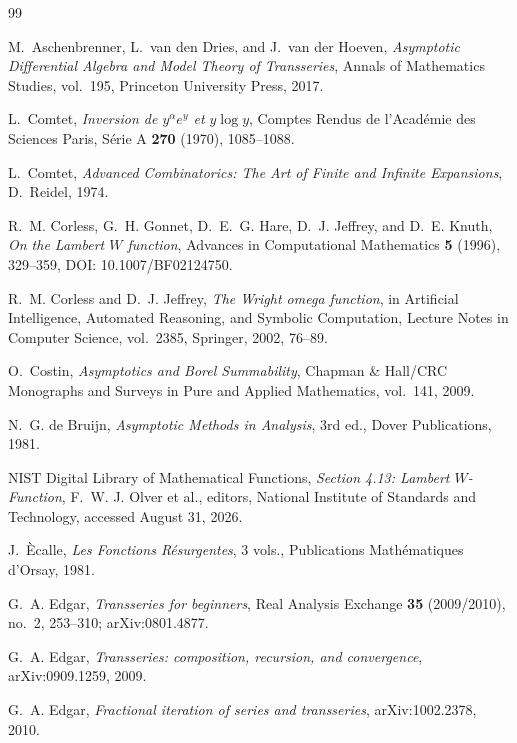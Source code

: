 \documentclass[11pt]{article}
\theoremstyle{pltheorem}
\begin{document}
\clearpage
\begin{thebibliography}{99}

M.~Aschenbrenner, L.~van den Dries, and J.~van der Hoeven,
\emph{Asymptotic Differential Algebra and Model Theory of Transseries},
Annals of Mathematics Studies, vol.~195, Princeton University Press, 2017.

L.~Comtet,
\emph{Inversion de \(y^\alpha e^y\) et \(y\log y\)},
Comptes Rendus de l'Acad\'emie des Sciences Paris, S\'erie A
\textbf{270} (1970), 1085--1088.

L.~Comtet,
\emph{Advanced Combinatorics: The Art of Finite and Infinite Expansions},
D.~Reidel, 1974.

R.~M. Corless, G.~H. Gonnet, D.~E.~G. Hare, D.~J. Jeffrey, and D.~E. Knuth,
\emph{On the Lambert \(W\) function},
Advances in Computational Mathematics \textbf{5} (1996), 329--359,
DOI: 10.1007/BF02124750.

R.~M. Corless and D.~J. Jeffrey,
\emph{The Wright omega function},
in Artificial Intelligence, Automated Reasoning, and Symbolic Computation,
Lecture Notes in Computer Science, vol.~2385, Springer, 2002, 76--89.

O.~Costin,
\emph{Asymptotics and Borel Summability},
Chapman \& Hall/CRC Monographs and Surveys in Pure and Applied Mathematics,
vol.~141, 2009.

N.~G. de Bruijn,
\emph{Asymptotic Methods in Analysis}, 3rd ed.,
Dover Publications, 1981.

NIST Digital Library of Mathematical Functions,
\emph{Section 4.13: Lambert \(W\)-Function},
F.~W. J. Olver et al., editors, National Institute of Standards and Technology,
accessed August 31, 2026.

J.~\`Ecalle,
\emph{Les Fonctions R\'esurgentes}, 3 vols.,
Publications Math\'ematiques d'Orsay, 1981.

G.~A. Edgar,
\emph{Transseries for beginners},
Real Analysis Exchange \textbf{35} (2009/2010), no.~2, 253--310;
arXiv:0801.4877.

G.~A. Edgar,
\emph{Transseries: composition, recursion, and convergence},
arXiv:0909.1259, 2009.

G.~A. Edgar,
\emph{Fractional iteration of series and transseries},
arXiv:1002.2378, 2010.


\end{thebibliography}
\end{document}
